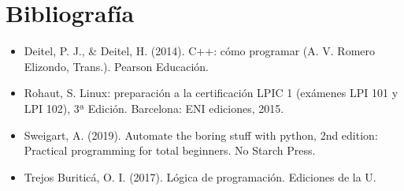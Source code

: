 \documentclass[letterpaper,10pt,spanish]{sphinxmanual}
\begin{document}
\sphinxstepscope


\chapter{Bibliografía}
\label{\detokenize{2_referencias/bibliografia:bibliografia}}\label{\detokenize{2_referencias/bibliografia::doc}}\begin{itemize}
\item {} 
\sphinxAtStartPar
Deitel, P. J., \& Deitel, H. (2014). C++: cómo programar (A. V. Romero Elizondo, Trans.). Pearson Educación.

\item {} 
\sphinxAtStartPar
Rohaut, S. Linux: preparación a la certificación LPIC 1 (exámenes LPI 101 y LPI 102), 3ª Edición. Barcelona: ENI ediciones, 2015.

\item {} 
\sphinxAtStartPar
Sweigart, A. (2019). Automate the boring stuff with python, 2nd edition: Practical programming for total beginners. No Starch Press.

\item {} 
\sphinxAtStartPar
Trejos Buriticá, O. I. (2017). Lógica de programación. Ediciones de la U.

\end{itemize}

\sphinxstepscope
\end{document}
